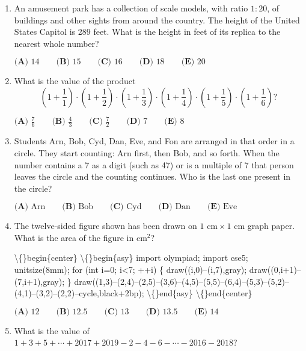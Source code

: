 \documentclass{article}
\begin{document}
\begin{enumerate}[label=\arabic*., itemsep=0.5em]\item An amusement park has a collection of scale models, with ratio \(1 : 20\), of buildings and other sights from around the country. The height of the United States Capitol is 289 feet. What is the height in feet of its replica to the nearest whole number?

\(\textbf{(A) }14\qquad\textbf{(B) }15\qquad\textbf{(C) }16\qquad\textbf{(D) }18\qquad\textbf{(E) }20\)\par \vspace{0.5em}\item What is the value of the product
\begin{equation*}
\left(1+\frac{1}{1}\right)\cdot\left(1+\frac{1}{2}\right)\cdot\left(1+\frac{1}{3}\right)\cdot\left(1+\frac{1}{4}\right)\cdot\left(1+\frac{1}{5}\right)\cdot\left(1+\frac{1}{6}\right)?
\end{equation*}


\(\textbf{(A) }\frac{7}{6}\qquad\textbf{(B) }\frac{4}{3}\qquad\textbf{(C) }\frac{7}{2}\qquad\textbf{(D) }7\qquad\textbf{(E) }8\)\par \vspace{0.5em}\item Students Arn, Bob, Cyd, Dan, Eve, and Fon are arranged in that order in a circle. They start counting: Arn first, then Bob, and so forth. When the number contains a 7 as a digit (such as 47) or is a multiple of 7 that person leaves the circle and the counting continues. Who is the last one present in the circle?

\(\textbf{(A) } \text{Arn}\qquad\textbf{(B) }\text{Bob}\qquad\textbf{(C) }\text{Cyd}\qquad\textbf{(D) }\text{Dan}\qquad \textbf{(E) }\text{Eve}\)\par \vspace{0.5em}\item The twelve-sided figure shown has been drawn on \(1 \text{ cm}\times 1 \text{ cm}\) graph paper. What is the area of the figure in \(\text{cm}^2\)?


\textbackslash\{\}begin\{center\}
\textbackslash\{\}begin\{asy\}
import olympiad;
import cse5;
unitsize(8mm);
for (int i=0; i<7; ++i) \{
  draw((i,0)--(i,7),gray);
  draw((0,i+1)--(7,i+1),gray);
\}
draw((1,3)--(2,4)--(2,5)--(3,6)--(4,5)--(5,5)--(6,4)--(5,3)--(5,2)--(4,1)--(3,2)--(2,2)--cycle,black+2bp);
\textbackslash\{\}end\{asy\}
\textbackslash\{\}end\{center\}


\(\textbf{(A) } 12 \qquad \textbf{(B) } 12.5 \qquad \textbf{(C) } 13 \qquad \textbf{(D) } 13.5 \qquad \textbf{(E) } 14\)\par \vspace{0.5em}\item What is the value of \(1+3+5+\cdots+2017+2019-2-4-6-\cdots-2016-2018\)?


\end{enumerate}
\end{document}
